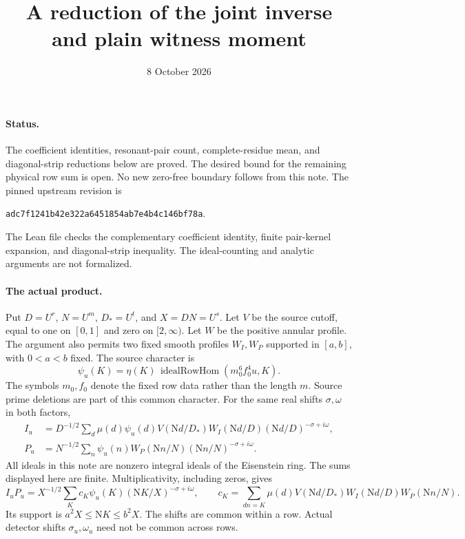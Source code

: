 \documentclass[11pt]{article}
\title{A reduction of the joint inverse and plain witness moment}
\author{}
\date{8 October 2026}
\newcommand{\N}{\mathrm N}
\begin{document}
\maketitle

\paragraph{Status.}
The coefficient identities, resonant-pair count, complete-residue mean,
and diagonal-strip reductions below are proved.
The desired bound for the remaining physical row sum is open.
No new zero-free boundary follows from this note.
The pinned upstream revision is
\begin{center}
\texttt{adc7f1241b42e322a6451854ab7e4b4c146bf78a}.
\end{center}
The Lean file  checks the complementary
coefficient identity, finite pair-kernel expansion, and diagonal-strip
inequality. The ideal-counting and analytic arguments are not formalized.

\paragraph{The actual product.}
Put $D=U^r$, $N=U^m$, $D_*=U^t$, and $X=DN=U^s$.
Let $V$ be the source cutoff, equal to one on $[0,1]$ and zero on
$[2,\infty)$. Let $W$ be the positive annular profile.
The argument also permits two fixed smooth profiles $W_I,W_P$ supported
in $[a,b]$, with $0<a<b$ fixed. The source character is
\[
 \psi_u(K)=\eta(K)\,
   \operatorname{idealRowHom}(m_0^6 f_0^4 u,K).
\]
The symbols $m_0,f_0$ denote the fixed row data rather than the length $m$.
Source prime deletions are part of this common character.
For the same real shifts $\sigma,\omega$ in both factors,
\begin{align*}
 I_u&=D^{-1/2}\sum_d\mu(d)\psi_u(d)V(\N d/D_*)
      W_I(\N d/D)(\N d/D)^{-\sigma+i\omega},\\
 P_u&=N^{-1/2}\sum_n\psi_u(n)
      W_P(\N n/N)(\N n/N)^{-\sigma+i\omega}.
\end{align*}
All ideals in this note are nonzero integral ideals of the Eisenstein ring.
The sums displayed here are finite. Multiplicativity, including zeros, gives
\begin{equation}\label{eq:product}
 I_uP_u=X^{-1/2}\sum_K c_K\psi_u(K)(\N K/X)^{-\sigma+i\omega},
 \qquad
 c_K=\sum_{dn=K}\mu(d)V(\N d/D_*)W_I(\N d/D)W_P(\N n/N).
\end{equation}
Its support is $a^2X\le\N K\le b^2X$.
The shifts are common within a row. Actual detector shifts
$\sigma_u,\omega_u$ need not be common across rows.
\end{document}
